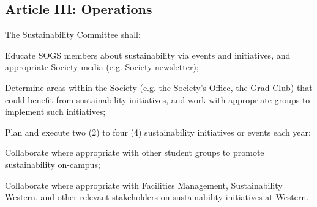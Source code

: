 \subsection{Article III: Operations}
\begin{longenum}[ label*=\thesubsection.\arabic*., align=left] 
\item The Sustainability Committee shall:
	\begin{longenum}[ label*=\arabic*., align=left]
	\item Educate SOGS members about sustainability via events and initiatives, and appropriate Society media (e.g. Society newsletter);
	\item Determine areas within the Society (e.g. the Society’s Office, the Grad Club) that could benefit from sustainability initiatives, and work with appropriate groups to implement such initiatives;
	\item Plan and execute two (2) to four (4) sustainability initiatives or events each year;
	\item Collaborate where appropriate with other student groups to promote sustainability on-campus;
	\item Collaborate where appropriate with Facilities Management, Sustainability Western, and other relevant stakeholders on sustainability initiatives at Western.
	\end{longenum}
\end{longenum}

